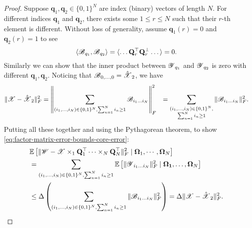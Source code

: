 \begin{proof}
Suppose $\mathbf{q}_1, \mathbf{q}_2 \in \{0,1\}^N$ are  index (binary) vectors of length $N$.
For different indices $\mathbf{q}_1$ and $\mathbf{q}_2$, there exists some $1\le r\le N$
such that their $r$-th element is different.
Without loss of generality, assume $\mathbf{q}_1(r) = 0$ and $\mathbf{q}_2(r)=1$ to see
\begin{equation}\label{eq:inner_prod2}
\langle \T{B}_{q_1}, \T{B}_{q_2}\rangle = \langle \dots \M{Q}_r^\top \M{Q}_r^\bot \dots\rangle  = 0.
\end{equation}
Similarly we can show that the inner product between $\T{Y}_{q_1}$ and $\T{Y}_{q_2}$ is zero with different $\mathbf{q}_1, \mathbf{q}_2$.  Noticing that  $\T{B}_{0,\ldots, 0} = \hat{\T{X}}_2$, we have
\begin{align*}
\|\T{X} - \hat{\T{X}}_2\|_F^2
&= \left\|\sum_{(i_1,\dots, i_N) \in \{0,1\}^N, \sum_{n=1}^N i_n \geq 1}  \T{B}_{i_1\dots i_N}\right \|_F^2
&= \sum_{\substack{(i_1,\dots, i_N) \in \{0,1\}^N, \\ \sum_{n=1}^N i_n \geq 1}} \|\T{B}_{i_1\dots i_N}\|_F^2.
\end{align*}
Putting all these together and using the Pythagorean theorem,
to show \ref{eq:factor-matrix-error-bounds-core-error}:
\begin{equation}
\begin{aligned}
&\mathbb{E}\left[ \|\T{W} - \T{X}\times_1 \M{Q}_1^\top \dots \times_N \M{Q}_N^\top\|_F^2 \mid \M{\Omega}_1, \cdots, \M{\Omega}_N \right] \\
& = \sum_{(i_1,\dots, i_N) \in \{0,1\}^N, \sum_{n=1}^N i_n \geq 1} \mathbb{E} \left[\|\T{Y}_{i_1\dots i_N}\|_F^2 \mid \M{\Omega_1}, \dots, \M{\Omega}_N\right]\\
&\le \Delta \left(\sum_{(i_1,\dots, i_N) \in \{0,1\}^N, \sum_{n=1}^N i_n \geq 1} \|\T{B}_{i_1\dots i_N}\|_F^2 \right)
= \Delta \|\T{X} - \hat{\T{X}}_2\|_F^2. \nonumber
\end{aligned}
\end{equation}
\end{proof}

